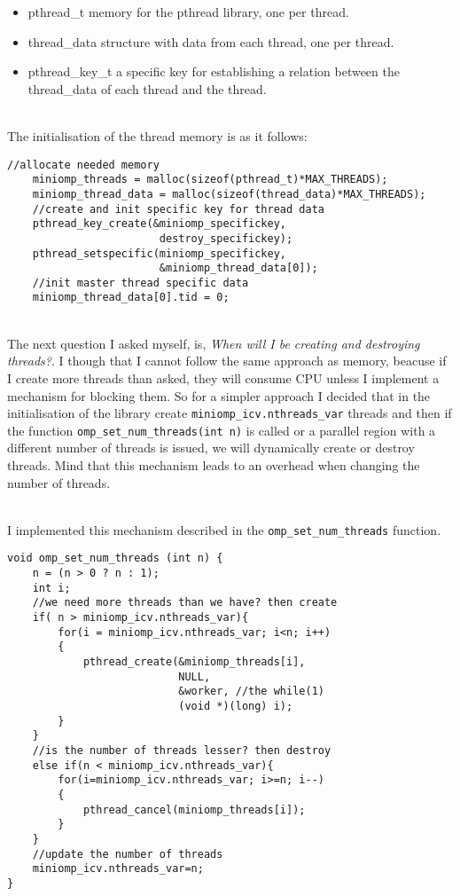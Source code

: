 \begin{itemize}
    \item pthread\_t memory for the pthread library, one per thread.
    \item thread\_data structure with data from each thread, one per thread.
    \item pthread\_key\_t a specific key for establishing a relation between the thread\_data of each thread and the thread.
\end{itemize}
\par ~\\
The initialisation of the thread memory is as it follows:
\begin{lstlisting}[caption=Initialisation of pthreads memory, label=PthreadInit]
    //allocate needed memory
    miniomp_threads = malloc(sizeof(pthread_t)*MAX_THREADS);
    miniomp_thread_data = malloc(sizeof(thread_data)*MAX_THREADS);
    //create and init specific key for thread data
    pthread_key_create(&miniomp_specifickey,
                        destroy_specifickey);
    pthread_setspecific(miniomp_specifickey,
                        &miniomp_thread_data[0]);
    //init master thread specific data
    miniomp_thread_data[0].tid = 0;
\end{lstlisting}

\par ~\\
The next question I asked myself, is, \textit{When will I be creating and destroying threads?}. I though that I cannot follow the same approach as memory, beacuse if I create more threads than asked, they will consume CPU unless I implement a mechanism for blocking them. So for a simpler approach I decided that in the initialisation of the library create \texttt{miniomp\_icv.nthreads\_var} threads and then if the function \texttt{omp\_set\_num\_threads(int n)} is called or a parallel region with a different number of threads is issued, we will dynamically create or destroy threads. Mind that this mechanism leads to an overhead when changing the number of threads. 
\par ~\\
I implemented this mechanism described in the \texttt{omp\_set\_num\_threads} function.

\begin{lstlisting}[caption=Dynamically changing the number of threads, label=ompsetnumthreads]
void omp_set_num_threads (int n) {
    n = (n > 0 ? n : 1);
    int i;
    //we need more threads than we have? then create
    if( n > miniomp_icv.nthreads_var){
        for(i = miniomp_icv.nthreads_var; i<n; i++)
        {
            pthread_create(&miniomp_threads[i],
                           NULL,
                           &worker, //the while(1)
                           (void *)(long) i);
        }
    }
    //is the number of threads lesser? then destroy
    else if(n < miniomp_icv.nthreads_var){
        for(i=miniomp_icv.nthreads_var; i>=n; i--)
        {
            pthread_cancel(miniomp_threads[i]);
        }
    }
    //update the number of threads
    miniomp_icv.nthreads_var=n;
}
\end{lstlisting}

